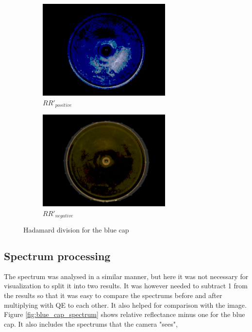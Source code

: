 \begin{figure}[h]
        \begin{subfigure}{0.5\textwidth}
            \includegraphics[width=0.9\linewidth, height=5cm]{figures/processed_camera_pictures/002_blue_cap_positive_difference.png}
            \caption{$RR'_{positive}$}
            \label{fig:002_blue_cap_positive_difference}
        \end{subfigure}%
        \begin{subfigure}{0.5\textwidth}
            \includegraphics[width=0.9\linewidth, height=5cm]{figures/processed_camera_pictures/002_blue_cap_negative_difference.png} 
            \caption{$RR'_{negative}$}
            \label{fig:002_blue_cap_negative_difference}
    \end{subfigure}
    
    \caption{Hadamard division for the blue cap}
    \label{fig:hadamard_division_blue_cap}
\end{figure}

\subsection{Spectrum processing}

The spectrum was analysed in a similar manner, but here it was not necessary for visualization to split it into two results. It was however needed to subtract 1 from the results so that it was easy to compare the spectrums before and after multiplying with QE to each other. It also helped for comparison with the image. Figure \ref{fig:blue_cap_spectrum} shows relative reflectance minus one for the blue cap. It also includes the spectrums that the camera "sees", 

